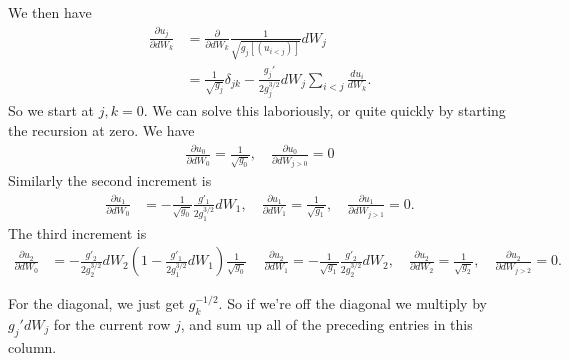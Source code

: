 We then have 
\begin{align}
\frac{\partial u_j}{\partial dW_k} &= \frac{\partial}{\partial dW_k}\frac{1}{\sqrt{g_j[(u_{i<j})]}}dW_j\\
&= \frac{1}{\sqrt{g_j}}\delta_{jk} -\frac{g_j'}{2g^{3/2}_j}dW_j\sum_{i<j}\frac{d u_i}{dW_k}.
\end{align}
So we start at $j,k=0$.  We can solve this laboriously, or quite quickly by starting the recursion at zero.  
We have 
\begin{gather}
\frac{\partial u_0}{\partial dW_0} = \frac{1}{\sqrt{g_0}}, \quad \frac{\partial u_0}{\partial dW_{j>0}} = 0
\end{gather}
Similarly the second increment is 
\begin{align}
\frac{\partial u_1}{\partial dW_0}& = -\frac{1}{\sqrt{g_0}}\frac{g'_1}{2g_1^{3/2}}dW_1, \quad \frac{\partial u_1}{\partial dW_1} = \frac{1}{\sqrt{g_1}} ,\quad \frac{\partial u_1}{\partial dW_{j>1}} = 0.
\end{align}
The third increment is 
\begin{align}
\frac{\partial u_2}{\partial dW_0}& = -\frac{g'_2}{2g_2^{3/2}}dW_2\left(1-\frac{g'_1}{2g_1^{3/2}}dW_1\right)\frac{1}{\sqrt{g_0}}\, \quad \frac{\partial u_2}{\partial dW_1} = -\frac{1}{\sqrt{g_1}}\frac{g'_2}{2g_2^{3/2}}dW_2, \quad \frac{\partial u_2}{\partial dW_2} = \frac{1}{\sqrt{g_2}}, \quad \frac{\partial u_2}{\partial dW_{j>2}} = 0.
\end{align}

For the diagonal, we just get $g_k^{-1/2}$. 
So if we're off the diagonal we multiply by $g_j' dW_j$ for the current row $j$, and sum up all of the preceding entries in this column.   


